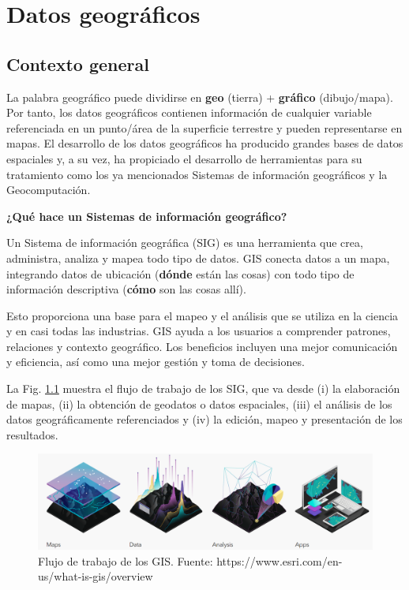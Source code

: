 \documentclass[
]{book}
\begin{document}
\hypertarget{datos-geogruxe1ficos}{%
\chapter{Datos geográficos}\label{datos-geogruxe1ficos}}

\hypertarget{contexto-general}{%
\section{Contexto general}\label{contexto-general}}

La palabra geográfico puede dividirse en \textbf{geo} (tierra) + \textbf{gráfico}
(dibujo/mapa). Por tanto, los datos geográficos contienen información de
cualquier variable referenciada en un punto/área de la superficie terrestre y
pueden representarse en mapas. El desarrollo de los datos geográficos ha
producido grandes bases de datos espaciales y, a su vez, ha propiciado el
desarrollo de herramientas para su tratamiento como los ya mencionados Sistemas
de información geográficos y la Geocomputación.

\textbf{¿Qué hace un Sistemas de información geográfico?}

Un Sistema de información geográfica (SIG) es una herramienta que crea,
administra, analiza y mapea todo tipo de datos. GIS conecta datos a un mapa,
integrando datos de ubicación (\textbf{dónde} están las cosas) con todo tipo de
información descriptiva (\textbf{cómo} son las cosas allí).

Esto proporciona una base para el mapeo y el análisis que se utiliza en la
ciencia y en casi todas las industrias. GIS ayuda a los usuarios a comprender
patrones, relaciones y contexto geográfico. Los beneficios incluyen una mejor
comunicación y eficiencia, así como una mejor gestión y toma de decisiones.

La Fig. \ref{fig:gisflujo} muestra el flujo de trabajo de los SIG, que va desde
(i) la elaboración de mapas, (ii) la obtención de geodatos o datos espaciales,
(iii) el análisis de los datos geográficamente referenciados y (iv) la edición,
mapeo y presentación de los resultados.

\begin{figure}

{\centering \includegraphics[width=0.7\linewidth]{img/GIS} 

}

\caption{Flujo de trabajo de los GIS. Fuente: https://www.esri.com/en-us/what-is-gis/overview}\label{fig:gisflujo}
\end{figure}
\end{document}
